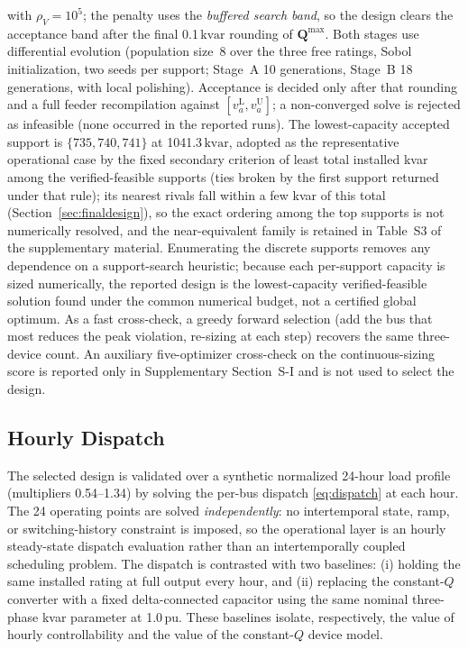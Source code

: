 \documentclass{ieeeaccess}
\newcommand{\SI}[2]{#1\,\ensuremath{\mathrm{#2}}}
\newcommand{\numrange}[2]{#1\mbox{--}#2}
\newcommand{\kvar}{\text{kvar}}
\begin{document}
with $\rho_V=10^{5}$; the penalty uses the \emph{buffered search band}, so the design
clears the acceptance band after the final \SI{0.1}{\kvar} rounding of
$\mathbf Q^{\max}$. Both stages use differential evolution (population size~8
over the three free ratings, Sobol initialization, two seeds per support; Stage~A 10
generations, Stage~B 18 generations, with local polishing). Acceptance is decided
only after that rounding and a full feeder recompilation against
$[v^{\mathrm L}_a,v^{\mathrm U}_a]$; a non-converged solve is rejected as infeasible
(none occurred in the reported runs). The lowest-capacity accepted support is $\{735,740,741\}$ at
\SI{1041.3}{\kvar}, adopted as the representative operational case by the fixed
secondary criterion of least total installed kvar among the verified-feasible
supports (ties broken by the first support returned under that rule); its nearest
rivals fall within a few kvar of this total (Section~\ref{sec:finaldesign}), so the
exact ordering among the top supports is not numerically resolved, and the
near-equivalent family is retained in Table~S3 of the supplementary material.
Enumerating the discrete supports removes any dependence on a support-search
heuristic; because each per-support capacity is sized numerically, the reported
design is the lowest-capacity verified-feasible solution found under the common
numerical budget, not a certified global optimum. As a fast cross-check, a greedy
forward selection (add the bus that most reduces the peak violation, re-sizing at
each step) recovers the same three-device count. An auxiliary five-optimizer
cross-check on the continuous-sizing score is reported only in Supplementary
Section~S-I and is not used to select the design.

\subsection{Hourly Dispatch}
The selected design is validated over a synthetic normalized 24-hour load
profile (multipliers \numrange{0.54}{1.34}) by solving the per-bus dispatch
\eqref{eq:dispatch} at each hour. The 24 operating points are solved
\emph{independently}: no intertemporal state, ramp, or switching-history constraint
is imposed, so the operational layer is an hourly steady-state dispatch evaluation
rather than an intertemporally coupled scheduling problem. The dispatch is
contrasted with two baselines:
(i) holding the same installed rating at full output every hour, and (ii)
replacing the constant-$Q$ converter with a fixed delta-connected capacitor using the
same nominal three-phase kvar parameter at \SI{1.0}{pu}. These baselines isolate, respectively, the value of
hourly controllability and the value of the constant-$Q$ device model.
\end{document}
